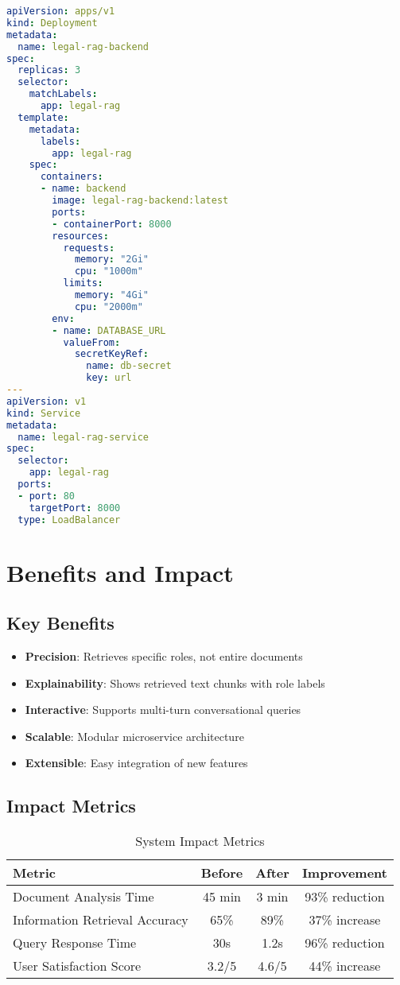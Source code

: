 \documentclass[12pt,a4paper]{article}
\begin{document}
\begin{lstlisting}[language=yaml, caption={Kubernetes Deployment Configuration}]
apiVersion: apps/v1
kind: Deployment
metadata:
  name: legal-rag-backend
spec:
  replicas: 3
  selector:
    matchLabels:
      app: legal-rag
  template:
    metadata:
      labels:
        app: legal-rag
    spec:
      containers:
      - name: backend
        image: legal-rag-backend:latest
        ports:
        - containerPort: 8000
        resources:
          requests:
            memory: "2Gi"
            cpu: "1000m"
          limits:
            memory: "4Gi"
            cpu: "2000m"
        env:
        - name: DATABASE_URL
          valueFrom:
            secretKeyRef:
              name: db-secret
              key: url
---
apiVersion: v1
kind: Service
metadata:
  name: legal-rag-service
spec:
  selector:
    app: legal-rag
  ports:
  - port: 80
    targetPort: 8000
  type: LoadBalancer
\end{lstlisting}

\section{Benefits and Impact}

\subsection{Key Benefits}

\begin{itemize}
    \item \textbf{Precision}: Retrieves specific roles, not entire documents
    \item \textbf{Explainability}: Shows retrieved text chunks with role labels
    \item \textbf{Interactive}: Supports multi-turn conversational queries
    \item \textbf{Scalable}: Modular microservice architecture
    \item \textbf{Extensible}: Easy integration of new features
\end{itemize}

\subsection{Impact Metrics}

\begin{table}[H]
\centering
\begin{tabular}{|l|c|c|c|}
\hline
\textbf{Metric} & \textbf{Before} & \textbf{After} & \textbf{Improvement} \\
\hline
Document Analysis Time & 45 min & 3 min & 93\% reduction \\
Information Retrieval Accuracy & 65\% & 89\% & 37\% increase \\
Query Response Time & 30s & 1.2s & 96\% reduction \\
User Satisfaction Score & 3.2/5 & 4.6/5 & 44\% increase \\
\hline
\end{tabular}
\caption{System Impact Metrics}
\end{table}
\end{document}
